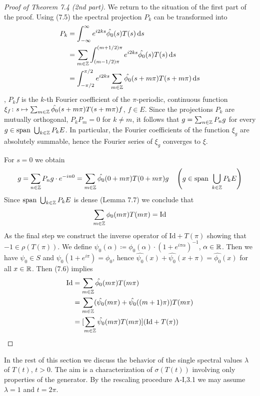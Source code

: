 \begin{proof}[Proof of Theorem 7.4 (2nd part)]
We return to the situation of the first part of the proof.
Using (7.5) the spectral projection $P_{k}$ can be transformed into
\begin{align*}
P_{k} &= \int_{-\infty}^{\infty} e^{i2ks}\hat{\phi_{0}}(s)T(s)\mathop{}\!\mathrm{d}{s} \\
&= \sum_{m\in\mathbb{Z}} \int_{(m-1/2)\pi}^{(m+1/2)\pi} e^{i2ks}\hat{\phi_{0}}(s)T(s)\mathop{}\!\mathrm{d}{s} \\
&= \int_{-\pi/2}^{\pi/2} e^{i2ks}\sum_{m\in\mathbb{Z}}\hat{\phi_{0}}(s+m\pi)T(s+m\pi)\mathop{}\!\mathrm{d}{s}
\end{align*}
\ie, $P_{k}f$ is the $k$-th Fourier coefficient of the $\pi$-periodic, continuous function $\xi_{f} \colon s \mapsto \sum_{m\in\mathbb{Z}} \hat{\phi_{0}}(s+m\pi)T(s+m\pi)f$, $f \in E$.
Since the projections $P_{k}$ are mutually orthogonal, \ie $P_{k}P_{m} = 0$ for $k \neq m$, it follows that $g = \sum_{n\in\mathbb{Z}} P_{n}g$ for every $g \in \text{span }\bigcup_{k\in\mathbb{Z}} P_{k}E$.
In particular, the Fourier coefficients of the function $\xi_{g}$ are absolutely summable, hence the Fourier series of $\xi_{g}$ converges to $\xi$.

For $s = 0$ we obtain
\[
g = \sum_{n\in\mathbb{Z}} P_{n}g\cdot e^{-in0} = \sum_{m\in\mathbb{Z}} \hat{\phi_{0}}(0 + m\pi)T(0 + m\pi)g \quad 
\left(g \in \text{span }\bigcup_{k\in\mathbb{Z}} P_{k}E\right)
\]
Since $\text{span }\bigcup_{k\in\mathbb{Z}} P_{k}E$ is dense (Lemma 7.7) we conclude that
\begin{equation}\label{eq:a3-7.7}
\sum_{m\in\mathbb{Z}} \phi_{0}(m\pi)T(m\pi) = \text{Id}
\end{equation}
As the final step we construct the inverse operator of $\text{Id} + T(\pi)$ showing that $-1 \in \rho(T(\pi))$.
We define $\psi_{0}(\alpha) \coloneqq \phi_{0}(\alpha)\cdot(1 + e^{i\pi\alpha})^{-1}$, $\alpha \in \mathbb{R}$.
Then we have $\psi_{0} \in S$ and $\psi_{0}(1 + e^{i\pi}) = \phi_{0}$,
hence $\hat{\psi_{0}}(x) + \hat{\psi_{0}}(x + \pi) = \hat{\phi_{0}}(x)$ for all $x \in \mathbb{R}$.
Then (7.6) implies
\begin{align*}
\text{Id} &= \sum_{m\in\mathbb{Z}} \hat{\phi_{0}}(m\pi)T(m\pi) \\
&= \sum_{m\in\mathbb{Z}} (\hat{\psi_{0}}(m\pi) + \hat{\psi_{0}}((m+1)\pi))T(m\pi) \\
&= [\sum_{m\in\mathbb{Z}} \hat{\psi_{0}}(m\pi)T(m\pi)](\text{Id} + T(\pi))
\end{align*}
\end{proof}
In the rest of this section we discuss the behavior of the single spectral values $\lambda$ of $T(t)$, $t > 0$.
The aim is a characterization of $\sigma(T(t))$ involving only properties of the generator.
By the rescaling procedure A-I,3.1 we may assume $\lambda = 1$ and $t = 2\pi$.

